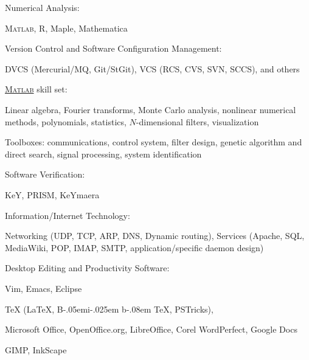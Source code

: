 \documentclass[10pt]{article}
\newcommand{\halfblankline}{\quad\vspace{-0.5\baselineskip}\pagebreak[3]}
\providecommand\BibTeX{{B\kern-.05em{\sc i\kern-.025em b}\kern-.08em \TeX}}
\providecommand\Matlab{\textsc{Matlab}}
\begin{document}
\halfblankline

Numerical Analysis:
%
\begin{innerlist}
    \item \Matlab, R, Maple, Mathematica
\end{innerlist}

\halfblankline

Version Control and Software Configuration Management:
%
\begin{innerlist}
    \item DVCS (Mercurial/MQ, Git/StGit), VCS (RCS, CVS, SVN, SCCS), and
        others
\end{innerlist}

\halfblankline

\href{http://www.mathworks.com/products/matlab/}{\Matlab} skill set:
%
\begin{innerlist}
    \item Linear algebra, Fourier transforms, Monte Carlo analysis,
        nonlinear numerical methods, polynomials, statistics,
        $N$-dimensional filters, visualization

    \item Toolboxes: communications, control system, filter design,
        genetic algorithm and direct search, signal processing, system
        identification
\end{innerlist}

\halfblankline

Software Verification:
%
\begin{innerlist}
    \item KeY, PRISM, KeYmaera
\end{innerlist}

\halfblankline

Information/Internet Technology:
%
\begin{innerlist}
    \item Networking (UDP, TCP, ARP, DNS, Dynamic
        routing), Services (Apache, SQL, MediaWiki, POP, IMAP, SMTP,
        application\-/specific daemon design)
\end{innerlist}

\halfblankline

Desktop Editing and Productivity Software:
%
\begin{innerlist}
    \item Vim, Emacs, Eclipse
    \item \TeX{} (\LaTeX{}, \BibTeX{}, PSTricks),
    \item Microsoft Office, OpenOffice.org, LibreOffice, Corel
        WordPerfect, Google Docs
    \item GIMP, InkScape
\end{innerlist}
\end{document}
